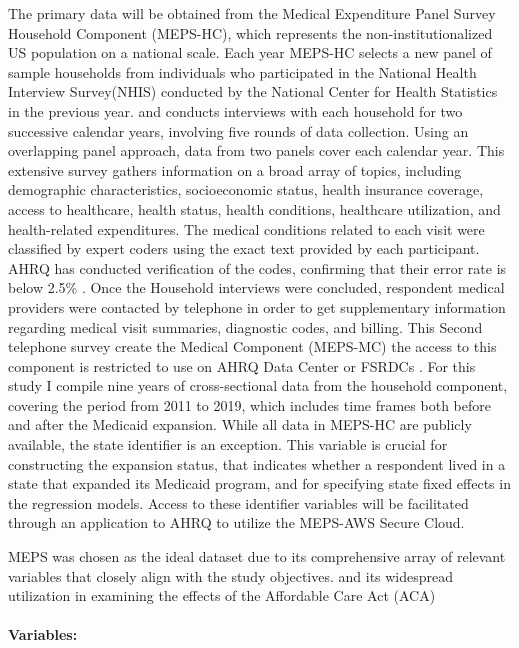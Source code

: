 \documentclass[man]{apa7}
\begin{document}
The primary data will be obtained from the Medical Expenditure Panel Survey Household Component (MEPS-HC), which represents the non-institutionalized US population on a national scale. Each year MEPS-HC selects a new panel of sample households from individuals who participated in the National Health Interview Survey(NHIS) conducted by the National Center for Health Statistics in the previous year.  and conducts interviews with each household for two successive calendar years, involving five rounds of data collection. Using an overlapping panel approach, data from two panels cover each calendar year. This extensive survey gathers information on a broad array of topics, including demographic characteristics, socioeconomic status, health insurance coverage, access to healthcare, health status,  health conditions, healthcare utilization, and health-related expenditures\parencite{ahrq_medical_2024}.
The medical conditions related to each visit were classified by expert coders using the exact text provided by each participant. AHRQ has conducted verification of the codes, confirming that their error rate is below 2.5\% \parencite{wang_fewer_2018}. Once the Household interviews were concluded, respondent medical providers were contacted by telephone in order to get supplementary information regarding medical visit summaries, diagnostic codes, and billing. This Second telephone survey create the Medical Component (MEPS-MC) the access to this component is restricted to use on AHRQ Data Center or FSRDCs \parencite{ahrq_medical_2024}. For this study I compile nine years of cross-sectional data from the household component, covering the period from 2011 to 2019, which includes time frames both before and after the Medicaid expansion. While all data in MEPS-HC are publicly available, the state identifier is an exception. This variable is crucial for constructing the expansion status, that indicates whether a respondent lived in a state that expanded its Medicaid program, and for specifying state fixed effects in the regression models. Access to these identifier variables will be facilitated through an application to AHRQ to utilize the MEPS-AWS Secure Cloud.

MEPS was chosen as the ideal dataset due to its comprehensive array of relevant variables that closely align with the study objectives. and its widespread utilization in examining the effects of the Affordable Care Act (ACA)

 
\paragraph{Variables:} 
\end{document}
